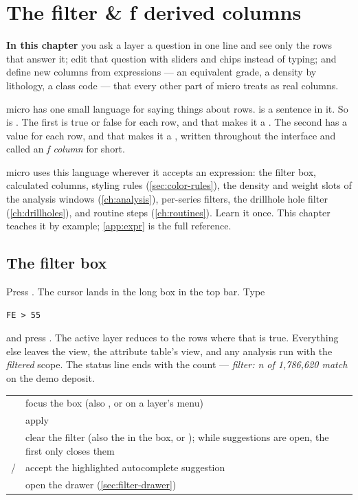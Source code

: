 \chapter{The filter \& ƒ derived columns}\label{ch:filter}
\begin{goals}
\textbf{In this chapter} you ask a layer a question in one line and see only the rows that answer it; edit that question with sliders and chips instead of typing; and define new columns from expressions — an equivalent grade, a density by lithology, a class code — that every other part of micro treats as real columns.
\end{goals}

micro has one small language for saying things about rows.  is a sentence in it. So is . The first is true or false for each row, and that makes it a . The second has a value for each row, and that makes it a , written  throughout the interface and called an \emph{ƒ column} for short.

micro uses this language wherever it accepts an expression: the filter box, calculated columns, styling rules (\cref{sec:color-rules}), the density and weight slots of the analysis windows (\cref{ch:analysis}), per-series filters, the drillhole hole filter (\cref{ch:drillholes}), and routine steps (\cref{ch:routines}). Learn it once. This chapter teaches it by example; \cref{app:expr} is the full reference.

\section{The filter box}\label{sec:filter-box}
Press \key{/}. The cursor lands in the long box in the top bar. Type

\begin{lstlisting}[language=expr]
FE > 55
\end{lstlisting}

and press . The active layer reduces to the rows where that is true. Everything else leaves the view, the attribute table's  view, and any analysis run with the \emph{filtered} scope. The status line ends with the count — \emph{filter: \textit{n} of 1,786,620 match} on the demo deposit.

\begin{center}
\begin{tabularx}{\linewidth}{@{}lL@{}}\toprule
\key{/} & focus the box (also , or  on a layer's menu) \\
 & apply \\
 & clear the filter (also the  in the box, or ); while suggestions are open, the first  only closes them \\
 /  & accept the highlighted autocomplete suggestion \\
 & open the drawer (\cref{sec:filter-drawer}) \\ \bottomrule
\end{tabularx}
\end{center}

